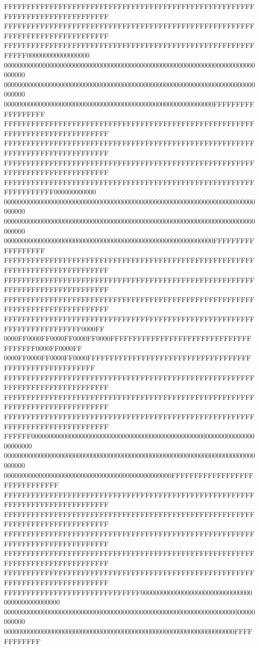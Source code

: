 FFFFFFFFFFFFFFFFFFFFFFFFFFFFFFFFFFFFFFFFFFFFFFFFFFFFFFFFFFFFFFFFFFFFFFFFFFFFFF
FFFFFFFFFFFFFFFFFFFFFFFFFFFFFFFFFFFFFFFFFFFFFFFFFFFFFFFFFFFFFFFFFFFFFFFFFFFFFF
FFFFFFFFFFFFFFFFFFFFFFFFFFFFFFFFFFFFFFFFFFFFFFFFFFFFFFFFFFFF000000000000000000
000000000000000000000000000000000000000000000000000000000000000000000000000000
000000000000000000000000000000000000000000000000000000000000000000000000000000
000000000000000000000000000000000000000000000000000000000000FFFFFFFFFFFFFFFFFF
FFFFFFFFFFFFFFFFFFFFFFFFFFFFFFFFFFFFFFFFFFFFFFFFFFFFFFFFFFFFFFFFFFFFFFFFFFFFFF
FFFFFFFFFFFFFFFFFFFFFFFFFFFFFFFFFFFFFFFFFFFFFFFFFFFFFFFFFFFFFFFFFFFFFFFFFFFFFF
FFFFFFFFFFFFFFFFFFFFFFFFFFFFFFFFFFFFFFFFFFFFFFFFFFFFFFFFFFFFFFFFFFFFFFFFFFFFFF
FFFFFFFFFFFFFFFFFFFFFFFFFFFFFFFFFFFFFFFFFFFFFFFFFFFFFFFFFFFFFFFFFF000000000000
000000000000000000000000000000000000000000000000000000000000000000000000000000
000000000000000000000000000000000000000000000000000000000000000000000000000000
000000000000000000000000000000000000000000000000000000000000FFFFFFFFFFFFFFFFFF
FFFFFFFFFFFFFFFFFFFFFFFFFFFFFFFFFFFFFFFFFFFFFFFFFFFFFFFFFFFFFFFFFFFFFFFFFFFFFF
FFFFFFFFFFFFFFFFFFFFFFFFFFFFFFFFFFFFFFFFFFFFFFFFFFFFFFFFFFFFFFFFFFFFFFFFFFFFFF
FFFFFFFFFFFFFFFFFFFFFFFFFFFFFFFFFFFFFFFFFFFFFFFFFFFFFFFFFFFFFFFFFFFFFFFFFFFFFF
FFFFFFFFFFFFFFFFFFFFFFFFFFFFFFFFFFFFFFFFFFFFFFFFFFFFFFFFFFFFFFFFFFFFFFFF0000FF
0000FF0000FF0000FF0000FF0000FFFFFFFFFFFFFFFFFFFFFFFFFFFFFFFFFFFFFF0000FF0000FF
0000FF0000FF0000FF0000FFFFFFFFFFFFFFFFFFFFFFFFFFFFFFFFFFFFFFFFFFFFFFFFFFFFFFFF
FFFFFFFFFFFFFFFFFFFFFFFFFFFFFFFFFFFFFFFFFFFFFFFFFFFFFFFFFFFFFFFFFFFFFFFFFFFFFF
FFFFFFFFFFFFFFFFFFFFFFFFFFFFFFFFFFFFFFFFFFFFFFFFFFFFFFFFFFFFFFFFFFFFFFFFFFFFFF
FFFFFFFFFFFFFFFFFFFFFFFFFFFFFFFFFFFFFFFFFFFFFFFFFFFFFFFFFFFFFFFFFFFFFFFFFFFFFF
FFFFFF000000000000000000000000000000000000000000000000000000000000000000000000
000000000000000000000000000000000000000000000000000000000000000000000000000000
000000000000000000000000000000000000000000000000FFFFFFFFFFFFFFFFFFFFFFFFFFFFFF
FFFFFFFFFFFFFFFFFFFFFFFFFFFFFFFFFFFFFFFFFFFFFFFFFFFFFFFFFFFFFFFFFFFFFFFFFFFFFF
FFFFFFFFFFFFFFFFFFFFFFFFFFFFFFFFFFFFFFFFFFFFFFFFFFFFFFFFFFFFFFFFFFFFFFFFFFFFFF
FFFFFFFFFFFFFFFFFFFFFFFFFFFFFFFFFFFFFFFFFFFFFFFFFFFFFFFFFFFFFFFFFFFFFFFFFFFFFF
FFFFFFFFFFFFFFFFFFFFFFFFFFFFFFFFFFFFFFFFFFFFFFFFFFFFFFFFFFFFFFFFFFFFFFFFFFFFFF
FFFFFFFFFFFFFFFFFFFFFFFFFFFFFFFFFFFFFFFFFFFFFFFFFFFFFFFFFFFFFFFFFFFFFFFFFFFFFF
FFFFFFFFFFFFFFFFFFFFFFFFFFFFFF000000000000000000000000000000000000000000000000
000000000000000000000000000000000000000000000000000000000000000000000000000000
000000000000000000000000000000000000000000000000000000000000000000FFFFFFFFFFFF
